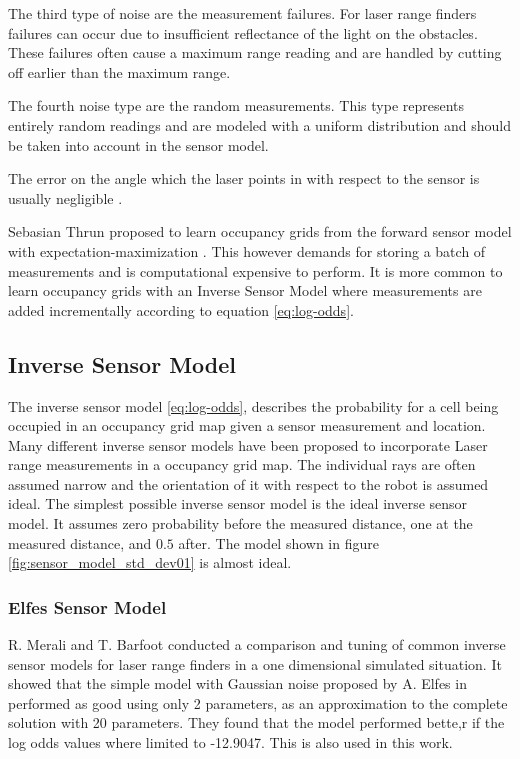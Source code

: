 The third type of noise are the measurement failures. 
For laser range finders failures can occur due to insufficient reflectance of the light on the obstacles. 
These failures often cause a maximum range reading and are handled by cutting off earlier than the maximum range.

The fourth noise type are the random measurements. This type represents entirely random readings and are modeled with a uniform distribution and should be taken into account in the sensor model.

The error on the angle which the laser points in with respect to the sensor is usually negligible \cite{probRob} .


Sebasian Thrun proposed to learn occupancy grids from the forward sensor model with expectation-maximization \cite{probRob}.
This however demands for storing a batch of measurements and is computational expensive to perform. 
It is more common to learn occupancy grids with an Inverse Sensor Model where measurements are added incrementally according to equation \ref{eq:log-odds}. 

\subsection{Inverse Sensor Model}
The inverse sensor model \ref{eq:log-odds}, describes the probability for a cell being occupied in an occupancy grid map given a sensor measurement and location.
Many different inverse sensor models have been proposed to incorporate Laser range measurements in a occupancy grid map. The individual rays are often assumed narrow and the orientation of it with respect to the robot is assumed ideal.
The simplest possible inverse sensor model is the 
ideal inverse sensor model. It assumes zero probability before the measured distance, one at the measured distance, and $0.5$ after. The model shown in figure \ref{fig:sensor_model_std_dev01} is almost ideal.

\subsubsection{Elfes Sensor Model}
R. Merali and T. Barfoot \cite{sensorModelTuning} conducted a comparison and tuning of common inverse sensor models for laser range finders in a one dimensional simulated situation. It showed that the simple model with Gaussian noise proposed by A. Elfes in \cite{elfes} performed as good using only 2 parameters, as an approximation to the complete solution with 20 parameters. They found that the model performed bette,r if the log odds values where limited to -12.9047. This is also used in this work.

